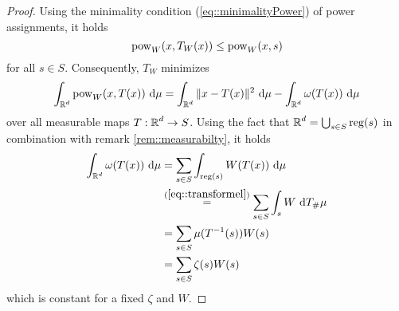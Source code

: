 \documentclass[
     12pt,         %
     a4paper,      %
     BCOR=10mm,     %
     DIV=14,        %
     ]{scrreprt}
\begin{document}
    \begin{proof}[Proof]
        Using the minimality condition (\ref{eq::minimalityPower}) of power assignments, it holds \[\operatorname{pow}_W(x,T_W(x)) \le \operatorname{pow}_W(x,s) \] for all $s\in S$. 
        Consequently, $T_W$ minimizes 
        \[ \int_{\operatorname{\mathbb{R}}^d} \operatorname{pow}_W(x,T(x)) \ {\operatorname{{\mathrm{d}}}} \mu =  \int_{\operatorname{\mathbb{R}}^d} \| x - T(x) \|^2 \ {\operatorname{{\mathrm{d}}}} \mu - \int_{\operatorname{\mathbb{R}}^d} \omega(T(x)) \ {\operatorname{{\mathrm{d}}}} \mu \]
        over all measurable maps $T:\operatorname{\mathbb{R}}^d \to S$. Using the fact that $\operatorname{\mathbb{R}}^d = \bigcup_{s\in S} \operatorname{reg}(s)$ in combination with remark \ref{rem::measurabilty}, it holds
        \begin{align*} 
            \int_{\operatorname{\mathbb{R}}^d} \omega(T(x)) \ {\operatorname{{\mathrm{d}}}} \mu &= \sum_{s\in S} \int_{\operatorname{reg}(s)} W(T(x)) \ {\operatorname{{\mathrm{d}}}} \mu \\ 
                                                 &\overset {(\ref{eq::transformel})}= \sum_{s\in S} \int_{s} W \ {\operatorname{{\mathrm{d}}}} T_{\#}\mu \\
                                                 &= \sum_{s\in S} \mu(T^{-1}(s))W(s) \\
                                                 &= \sum_{s\in S} \zeta(s)W(s) 
        \end{align*}
        which is constant for a fixed $\zeta$ and $W$.
    \end{proof}
\end{document}
